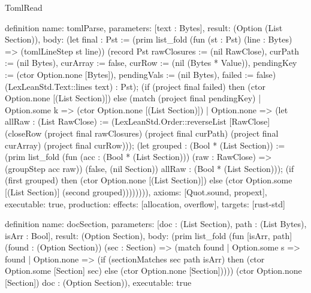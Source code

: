 \begin{lexlean}{TomlRead}
\begin{semanticmodule}
definition{
  name: tomlParse,
  parameters: [text : Bytes],
  result: (Option (List Section)),
  body:
   (let final : Pst := (prim list_fold (fun (st : Pst) (line : Bytes) => (tomlLineStep st line)) (record Pst {rawClosures := (nil RawClose), curPath := (nil Bytes), curArray := false, curRow := (nil (Bytes * Value)), pendingKey := (ctor Option.none [Bytes]), pendingVals := (nil Bytes), failed := false}) (LexLeanStd.Text::lines text) : Pst);
    (if (project final failed) then (ctor Option.none [(List Section)])
     else (match (project final pendingKey)
       | Option.some k => (ctor Option.none [(List Section)])
       | Option.none =>
           (let allRaw : (List RawClose) := (LexLeanStd.Order::reverseList [RawClose] (closeRow (project final rawClosures) (project final curPath) (project final curArray) (project final curRow)));
            (let grouped : (Bool * (List Section)) := (prim list_fold (fun (acc : (Bool * (List Section))) (raw : RawClose) => (groupStep acc raw)) (false, (nil Section)) allRaw : (Bool * (List Section)));
             (if (first grouped) then (ctor Option.none [(List Section)]) else (ctor Option.some [(List Section)] (second grouped)))))))),
  axioms: [Quot.sound, propext],
  executable: true,
  production: {effects: [allocation, overflow], targets: [rust-std]}
}

definition{
  name: docSection,
  parameters: [doc : (List Section), path : (List Bytes), isArr : Bool],
  result: (Option Section),
  body: (prim list_fold (fun [isArr, path] (found : (Option Section)) (sec : Section) => (match found | Option.some s => found | Option.none => (if (sectionMatches sec path isArr) then (ctor Option.some [Section] sec) else (ctor Option.none [Section])))) (ctor Option.none [Section]) doc : (Option Section)),
  executable: true
}
\end{semanticmodule}
\end{lexlean}
